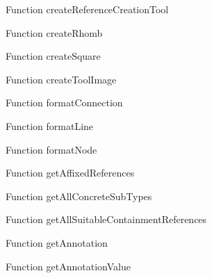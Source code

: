 \begin{minipage}[b]{0.5\textwidth}
\centering
{}
Function createReferenceCreationTool
\end{minipage}
\begin{minipage}[b]{0.5\textwidth}
\centering
{}
Function createRhomb
\end{minipage}
\begin{minipage}[b]{0.5\textwidth}
\centering
{}
Function createSquare
\end{minipage}
\begin{minipage}[b]{0.5\textwidth}
\centering
{}
Function createToolImage
\end{minipage}
\begin{minipage}[b]{0.5\textwidth}
\centering
{}
Function formatConnection
\end{minipage}
\begin{minipage}[b]{0.5\textwidth}
\centering
{}
Function formatLine
\end{minipage}
\begin{minipage}[b]{0.5\textwidth}
\centering
{}
Function formatNode
\end{minipage}
\begin{minipage}[b]{0.5\textwidth}
\centering
{}
Function getAffixedReferences
\end{minipage}
\begin{minipage}[b]{0.5\textwidth}
\centering
{}
Function getAllConcreteSubTypes
\end{minipage}
\begin{minipage}[b]{0.5\textwidth}
\centering
{}
Function getAllSuitableContainmentReferences
\end{minipage}
\begin{minipage}[b]{0.5\textwidth}
\centering
{}
Function getAnnotation
\end{minipage}
\begin{minipage}[b]{0.5\textwidth}
\centering
{}
Function getAnnotationValue
\end{minipage}
